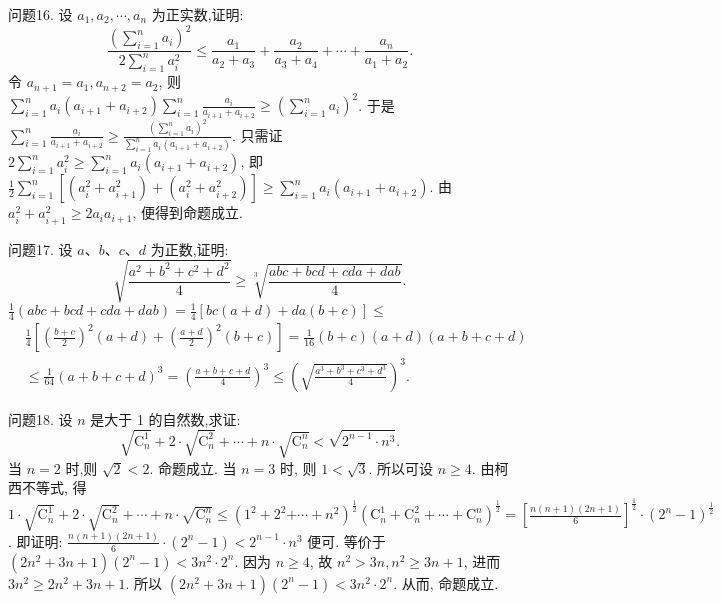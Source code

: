 问题16. 设 $a_1, a_2, \cdots, a_n$ 为正实数,证明:
$$
\frac{\left(\sum_{i=1}^n a_i\right)^2}{2 \sum_{i=1}^n a_i^2} \leqslant \frac{a_1}{a_2+a_3}+\frac{a_2}{a_3+a_4}+\cdots+\frac{a_n}{a_1+a_2} .
$$
令 $a_{n+1}=a_1, a_{n+2}=a_2$, 则 $\sum_{i=1}^n a_i\left(a_{i+1}+a_{i+2}\right) \sum_{i=1}^n \frac{a_i}{a_{i+1}+a_{i+2}} \geqslant \left(\sum_{i=1}^n a_i\right)^2$. 于是 $\sum_{i=1}^n \frac{a_i}{a_{i+1}+a_{i+2}} \geqslant \frac{\left(\sum_{i=1}^n a_i\right)^2}{\sum_{i=1}^n a_i\left(a_{i+1}+a_{i+2}\right)}$. 只需证 $2 \sum_{i=1}^n a_i^2 \geqslant \sum_{i=1}^n a_i\left(a_{i+1}+a_{i+2}\right)$, 即 $\frac{1}{2} \sum_{i=1}^n\left[\left(a_i^2+a_{i+1}^2\right)+\left(a_i^2+a_{i+2}^2\right)\right] \geqslant \sum_{i=1}^n a_i\left(a_{i+1}+a_{i+2}\right)$. 由 $a_i^2+a_{i+1}^2 \geqslant 2 a_i a_{i+1}$, 便得到命题成立.



问题17. 设 $a 、 b 、 c 、 d$ 为正数,证明:
$$
\sqrt{\frac{a^2+b^2+c^2+d^2}{4}} \geqslant \sqrt[3]{\frac{a b c+b c d+c d a+d a b}{4}} .
$$
$\frac{1}{4}(a b c+b c d+c d a+d a b)=\frac{1}{4}[b c(a+d)+d a(b+c)] \leqslant$
$$
\begin{aligned}
& \frac{1}{4}\left[\left(\frac{b+c}{2}\right)^2(a+d)+\left(\frac{a+d}{2}\right)^2(b+c)\right]=\frac{1}{16}(b+c)(a+d)(a+b+c+d) \\
& \leqslant \frac{1}{64}(a+b+c+d)^3=\left(\frac{a+b+c+d}{4}\right)^3 \leqslant\left(\sqrt{\frac{a^3+b^3+c^3+d^3}{4}}\right)^3 .
\end{aligned}
$$



问题18. 设 $n$ 是大于 1 的自然数,求证:
$$
\sqrt{\mathrm{C}_n^1}+2 \cdot \sqrt{\mathrm{C}_n^2}+\cdots+n \cdot \sqrt{\mathrm{C}_n^n}<\sqrt{2^{n-1} \cdot n^3} .
$$
当 $n=2$ 时,则 $\sqrt{2}<2$. 命题成立.
当 $n=3$ 时, 则 $1<\sqrt{3}$. 所以可设 $n \geqslant 4$. 由柯西不等式, 得 $1 \cdot \sqrt{\mathrm{C}_n^1}+2 \cdot \sqrt{\mathrm{C}_n^2}+\cdots+n \cdot \sqrt{\mathrm{C}_n^n} \leqslant\left(1^2+2^2\right. \left.+\cdots+n^2\right)^{\frac{1}{2}}\left(\mathrm{C}_n^1+\mathrm{C}_n^2+\cdots+\mathrm{C}_n^n\right)^{\frac{1}{2}}=\left[\frac{n(n+1)(2 n+1)}{6}\right]^{\frac{1}{2}} \cdot\left(2^n-1\right)^{\frac{1}{2}}$. 即证明: $\frac{n(n+1)(2 n+1)}{6} \cdot\left(2^n-1\right)<2^{n-1} \cdot n^3$ 便可.
等价于 $\left(2 n^2+3 n+1\right) \left(2^n-1\right)<3 n^2 \cdot 2^n$. 因为 $n \geqslant 4$, 故 $n^2>3 n, n^2 \geqslant 3 n+1$, 进而 $3 n^2 \geqslant 2 n^2+ 3 n+1$. 所以 $\left(2 n^2+3 n+1\right)\left(2^n-1\right)<3 n^2 \cdot 2^n$. 从而, 命题成立.


